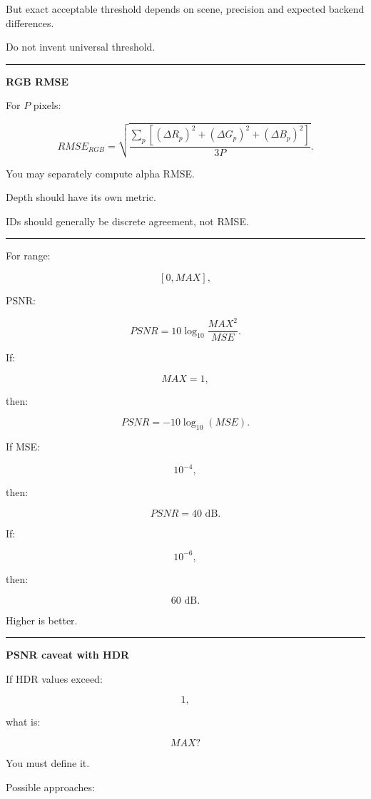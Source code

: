 But exact acceptable threshold depends on scene, precision and expected backend differences.

Do not invent universal threshold.

\begin{center}\rule{0.5\linewidth}{0.5pt}\end{center}

\textbf{RGB RMSE}

For \(P\) pixels:

\[
\boxed{
RMSE_{RGB}
=
\sqrt{
\frac{
\sum_{p}
[
(\Delta R_p)^2+
(\Delta G_p)^2+
(\Delta B_p)^2
]
}{
3P
}
}.
}
\]

You may separately compute alpha RMSE.

Depth should have its own metric.

IDs should generally be discrete agreement, not RMSE.

\begin{center}\rule{0.5\linewidth}{0.5pt}\end{center}

For range:

\[
[0,MAX],
\]

PSNR:

\[
\boxed{
PSNR
=
10\log_{10}
\frac{MAX^2}{MSE}.
}
\]

If:

\[
MAX=1,
\]

then:

\[
PSNR
=
-10\log_{10}(MSE).
\]

If MSE:

\[
10^{-4},
\]

then:

\[
PSNR=40\text{ dB}.
\]

If:

\[
10^{-6},
\]

then:

\[
60\text{ dB}.
\]

Higher is better.

\begin{center}\rule{0.5\linewidth}{0.5pt}\end{center}

\textbf{PSNR caveat with HDR}

If HDR values exceed:

\[
1,
\]

what is:

\[
MAX?
\]

You must define it.

Possible approaches:

